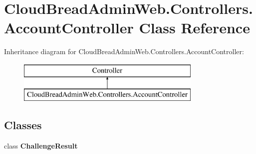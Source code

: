 \hypertarget{class_cloud_bread_admin_web_1_1_controllers_1_1_account_controller}{}\section{Cloud\+Bread\+Admin\+Web.\+Controllers.\+Account\+Controller Class Reference}
\label{class_cloud_bread_admin_web_1_1_controllers_1_1_account_controller}
Inheritance diagram for Cloud\+Bread\+Admin\+Web.\+Controllers.\+Account\+Controller\+:\begin{figure}[H]
\begin{center}
\leavevmode
\includegraphics[height=2.000000cm]{class_cloud_bread_admin_web_1_1_controllers_1_1_account_controller}
\end{center}
\end{figure}
\subsection*{Classes}
\begin{DoxyCompactItemize}
\item 
class {\bfseries Challenge\+Result}
\end{DoxyCompactItemize}
